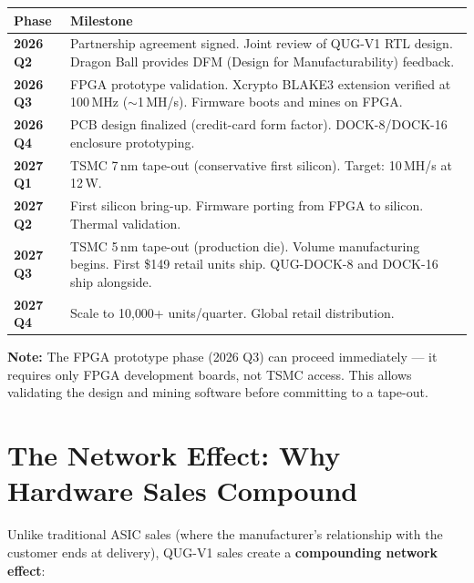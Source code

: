 \documentclass[11pt,a4paper]{article}
\begin{document}
\begin{center}
\begin{tabular}{@{}p{2.5cm}p{11.5cm}@{}}
\toprule
\textbf{Phase} & \textbf{Milestone} \\
\midrule
\textbf{2026 Q2} & Partnership agreement signed. Joint review of QUG-V1 RTL design. Dragon Ball provides DFM (Design for Manufacturability) feedback. \\
\textbf{2026 Q3} & FPGA prototype validation. Xcrypto BLAKE3 extension verified at 100\,MHz ($\sim$1\,MH/s). Firmware boots and mines on FPGA. \\
\textbf{2026 Q4} & PCB design finalized (credit-card form factor). DOCK-8/DOCK-16 enclosure prototyping. \\
\textbf{2027 Q1} & TSMC 7\,nm tape-out (conservative first silicon). Target: 10\,MH/s at 12\,W. \\
\textbf{2027 Q2} & First silicon bring-up. Firmware porting from FPGA to silicon. Thermal validation. \\
\textbf{2027 Q3} & TSMC 5\,nm tape-out (production die). Volume manufacturing begins. First \$149 retail units ship. QUG-DOCK-8 and DOCK-16 ship alongside. \\
\textbf{2027 Q4} & Scale to 10{,}000+ units/quarter. Global retail distribution. \\
\bottomrule
\end{tabular}
\end{center}

\textbf{Note:} The FPGA prototype phase (2026 Q3) can proceed immediately --- it requires only FPGA development boards, not TSMC access. This allows validating the design and mining software before committing to a tape-out.


\section{The Network Effect: Why Hardware Sales Compound}

Unlike traditional ASIC sales (where the manufacturer's relationship with the customer ends at delivery), QUG-V1 sales create a \textbf{compounding network effect}:
\end{document}
